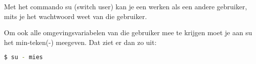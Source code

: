 Met het commando su (switch user) kan je een werken als een andere gebruiker, mits je het wachtwoord weet van die gebruiker.

Om ook alle omgevingsvariabelen van die gebruiker mee te krijgen moet je aan su het min-teken(-) meegeven. Dat ziet er dan zo uit:
\begin{lstlisting}[language=bash]
$ su - mies
\end{lstlisting}
